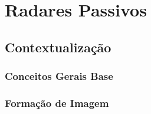 
\chapter{Radares Passivos} %

\label{chap:Chapter2} %


\section{Contextualização}


\subsection{Conceitos Gerais Base}


\subsection{Formação de Imagem}

